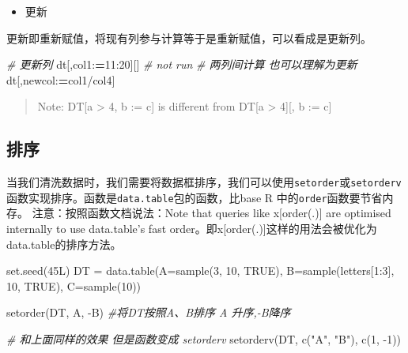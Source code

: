 \documentclass[
]{book}
\newenvironment{Shaded}{\begin{snugshade}}{\end{snugshade}}
\newcommand{\AttributeTok}[1]{\textcolor[rgb]{0.77,0.63,0.00}{#1}}
\newcommand{\CommentTok}[1]{\textcolor[rgb]{0.56,0.35,0.01}{\textit{#1}}}
\newcommand{\ConstantTok}[1]{\textcolor[rgb]{0.00,0.00,0.00}{#1}}
\newcommand{\DecValTok}[1]{\textcolor[rgb]{0.00,0.00,0.81}{#1}}
\newcommand{\ErrorTok}[1]{\textcolor[rgb]{0.64,0.00,0.00}{\textbf{#1}}}
\newcommand{\FunctionTok}[1]{\textcolor[rgb]{0.00,0.00,0.00}{#1}}
\newcommand{\NormalTok}[1]{#1}
\newcommand{\OtherTok}[1]{\textcolor[rgb]{0.56,0.35,0.01}{#1}}
\newcommand{\SpecialCharTok}[1]{\textcolor[rgb]{0.00,0.00,0.00}{#1}}
\newcommand{\StringTok}[1]{\textcolor[rgb]{0.31,0.60,0.02}{#1}}
\providecommand{\tightlist}{%
  \setlength{\itemsep}{0pt}\setlength{\parskip}{0pt}}
\begin{document}
\begin{itemize}
\tightlist
\item
  更新
\end{itemize}

更新即重新赋值，将现有列参与计算等于是重新赋值，可以看成是更新列。

\begin{Shaded}
\begin{Highlighting}[]
\CommentTok{\# 更新列}
\NormalTok{dt[,col1}\SpecialCharTok{:}\ErrorTok{=}\DecValTok{11}\SpecialCharTok{:}\DecValTok{20}\NormalTok{][]}
\CommentTok{\# not run }
\CommentTok{\# 两列间计算 也可以理解为更新}
\NormalTok{dt[,newcol}\SpecialCharTok{:}\ErrorTok{=}\NormalTok{col1}\SpecialCharTok{/}\NormalTok{col4]}
\end{Highlighting}
\end{Shaded}

\begin{quote}
Note: DT{[}a \textgreater{} 4, b := c{]} is different from DT{[}a \textgreater{} 4{]}{[}, b := c{]}
\end{quote}

\hypertarget{ux6392ux5e8f}{%
\subsection{排序}\label{ux6392ux5e8f}}

当我们清洗数据时，我们需要将数据框排序，我们可以使用\texttt{setorder}或\texttt{setorderv}函数实现排序。函数是\texttt{data.table}包的函数，比base R 中的\texttt{order}函数要节省内存。
注意：按照函数文档说法：Note that queries like x{[}order(.){]} are optimised internally to use data.table's fast order。即x{[}order(.){]}这样的用法会被优化为data.table的排序方法。

\begin{Shaded}
\begin{Highlighting}[]
\FunctionTok{set.seed}\NormalTok{(45L)}
\NormalTok{DT }\OtherTok{=} \FunctionTok{data.table}\NormalTok{(}\AttributeTok{A=}\FunctionTok{sample}\NormalTok{(}\DecValTok{3}\NormalTok{, }\DecValTok{10}\NormalTok{, }\ConstantTok{TRUE}\NormalTok{),}
         \AttributeTok{B=}\FunctionTok{sample}\NormalTok{(letters[}\DecValTok{1}\SpecialCharTok{:}\DecValTok{3}\NormalTok{], }\DecValTok{10}\NormalTok{, }\ConstantTok{TRUE}\NormalTok{), }\AttributeTok{C=}\FunctionTok{sample}\NormalTok{(}\DecValTok{10}\NormalTok{))}

\FunctionTok{setorder}\NormalTok{(DT, A, }\SpecialCharTok{{-}}\NormalTok{B) }\CommentTok{\#将DT按照A、B排序 A 升序,{-}B降序}

\CommentTok{\# 和上面同样的效果 但是函数变成 setorderv}
\FunctionTok{setorderv}\NormalTok{(DT, }\FunctionTok{c}\NormalTok{(}\StringTok{"A"}\NormalTok{, }\StringTok{"B"}\NormalTok{), }\FunctionTok{c}\NormalTok{(}\DecValTok{1}\NormalTok{, }\SpecialCharTok{{-}}\DecValTok{1}\NormalTok{))}
\end{Highlighting}
\end{Shaded}
\end{document}
